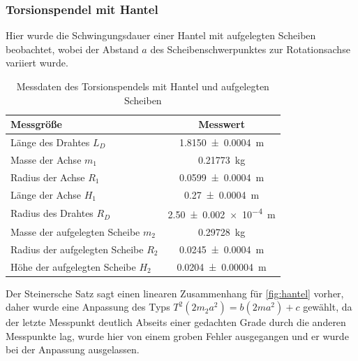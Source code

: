










\subsubsection*{Torsionspendel mit Hantel}
Hier wurde die Schwingungsdauer einer Hantel mit aufgelegten Scheiben beobachtet, wobei der Abstand $a$ des Scheibenschwerpunktes zur Rotationsachse variiert wurde. 



\begin{table}[h]
	\centering	
	\caption{Messdaten des Torsionspendels mit Hantel und aufgelegten Scheiben  }
	\begin{tabular}{|l|c|} 
		\hline 
		Messgröße	& Messwert  \\ 
		\hline 
		Länge des Drahtes $L_D$& \SI{1.8150\pm 0.0004 } {m} \\ 
		\hline 
		Masse der Achse $m_1$& \SI{0.21773}{kg} \\ 
		\hline 
		Radius der Achse $R_1$ & \SI{0.0599 \pm 0.0004}{m}  \\ 
		\hline 
		Länge der Achse $H_1$ &	\SI{0.27\pm 0.0004}	{\metre}	\\
		\hline
		Radius des Drahtes $R_D$ & \SI{2.50+-0.002 e-4} {m} \\ 
		\hline 
		Masse der aufgelegten Scheibe $m_2$& \SI{0.29728}{kg} \\ 
		\hline 
		Radius der aufgelegten Scheibe $R_2$ & \SI{0.0245 \pm 0.0004}{m}  \\ 
		\hline 
		Höhe der aufgelegten Scheibe $H_2$ &\SI{0.0204\pm0.00004 }{\metre}			\\
		\hline
	
	\end{tabular} 
	
	\label{tab:dataTH}
\end{table} 

Der Steinersche Satz sagt einen linearen Zusammenhang für \cref{fig:hantel} vorher, daher wurde eine Anpassung des Typs $T^2(2m_2 a^2)=b (2m a^2)+c$ gewählt, da der letzte Messpunkt deutlich Abseits einer gedachten Grade durch die anderen Messpunkte lag, wurde hier von einem groben Fehler ausgegangen und er wurde bei der Anpassung ausgelassen.


